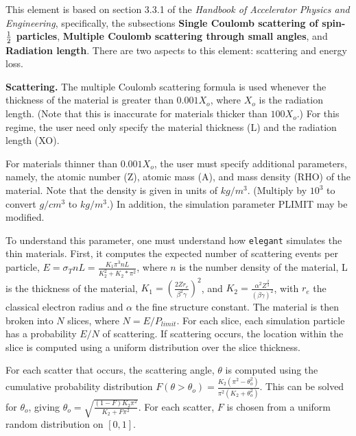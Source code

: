 This element is based on section 3.3.1 of the {\em Handbook of
Accelerator Physics and Engineering}, specifically, the
subsections {\bf Single Coulomb scattering of spin-${\rm \frac{1}{2}}$
particles}, {\bf Multiple Coulomb scattering through small angles},
and {\bf Radiation length}.
There are two aspects to this element: scattering and energy loss.

{\bf Scattering.}  The multiple Coulomb scattering formula is used
whenever the thickness of the material is greater than $0.001 X_o$,
where $X_o$ is the radiation length.  (Note that this is inaccurate
for materials thicker than $100 X_o$.)  For this regime, the user need
only specify the material thickness (L) and the radiation length (XO).

For materials thinner than $0.001 X_o$, the user must specify
additional parameters, namely, the atomic number (Z), atomic mass (A),
and mass density (RHO) of the material.  Note that the density is
given in units of $kg/m^3$.  (Multiply by $10^3$ to convert $g/cm^3$
to $kg/m^3$.)  In addition, the simulation parameter PLIMIT may be
modified.  

To understand this parameter, one must understand how {\tt elegant}
simulates the thin materials.  First, it computes the expected number
of scattering events per particle, $ E = \sigma_T n L = \frac{K_1
\pi^3 n L}{K_2^2 + K_2*\pi^2} $, where $n$ is the number density of
the material, L is the thickness of the material, $K_1 = (\frac{2 Z r_e}{\beta^2 \gamma})^2$, 
and $K_2 = \frac{\alpha^2 Z^{\frac{2}{3}}}{(\beta\gamma)^2}$, with $r_e$ the classical electron radius
and $\alpha$ the fine structure constant.  The material is then broken
into $N$ slices, where $N = E/P_{limit}$.  For each slice, each
simulation particle has a probability $E/N$ of scattering.  If scattering
occurs, the location within the slice is computed using a uniform
distribution over the slice thickness.

For each scatter that occurs, the scattering angle, $\theta$ is
computed using the cumulative probability distribution
$F(\theta>\theta_o) = \frac{K_2 (\pi^2 - \theta_o^2)}{\pi^2 (K_2 +
\theta_o^2)}$.  This can be solved for $\theta_o$, giving
$\theta_o = \sqrt{\frac{(1-F)K_2\pi^2}{K_2 + F \pi^2}}$.  For each scatter,
$F$ is chosen from a uniform random distribution on $[0,1]$.


